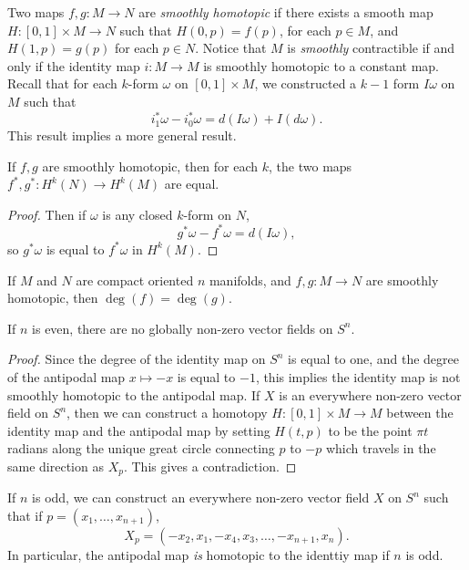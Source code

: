 Two maps $f,g: M \to N$ are \emph{smoothly homotopic} if there exists a smooth map $H: [0,1] \times M \to N$ such that $H(0,p) = f(p)$, for each $p \in M$, and $H(1,p) = g(p)$ for each $p \in N$. Notice that $M$ is \emph{smoothly} contractible if and only if the identity map $i: M \to M$ is smoothly homotopic to a constant map. Recall that for each $k$-form $\omega$ on $[0,1] \times M$, we constructed a $k-1$ form $I\omega$ on $M$ such that
%
\[ i_1^* \omega - i_0^* \omega = d(I\omega) + I(d\omega). \]
%
This result implies a more general result.

\begin{theorem}
    If $f,g$ are smoothly homotopic, then for each $k$, the two maps $f^*, g^*: H^k(N) \to H^k(M)$ are equal.
\end{theorem}
\begin{proof}
    Then if $\omega$ is any closed $k$-form on $N$,
    \[ g^* \omega - f^* \omega = d(I \omega), \]
    so $g^* \omega$ is equal to $f^* \omega$ in $H^k(M)$.
\end{proof}

\begin{corollary}
    If $M$ and $N$ are compact oriented $n$ manifolds, and $f,g: M \to N$ are smoothly homotopic, then $\deg(f) = \deg(g)$.
\end{corollary}

\begin{corollary}
    If $n$ is even, there are no globally non-zero vector fields on $S^n$.
\end{corollary}
\begin{proof}
    Since the degree of the identity map on $S^n$ is equal to one, and the degree of the antipodal map $x \mapsto -x$ is equal to $-1$, this implies the identity map is not smoothly homotopic to the antipodal map. If $X$ is an everywhere non-zero vector field on $S^n$, then we can construct a homotopy $H: [0,1] \times M \to M$ between the identity map and the antipodal map by setting $H(t,p)$ to be the point $\pi t$ radians along the unique great circle connecting $p$ to $-p$ which travels in the same direction as $X_p$. This gives a contradiction.
\end{proof}

\begin{remark}
    If $n$ is odd, we can construct an everywhere non-zero vector field $X$ on $S^n$ such that if $p = (x_1, \dots, x_{n+1})$,
    \[ X_p = (-x_2,x_1,-x_4,x_3, \dots, -x_{n+1},x_n). \]
    In particular, the antipodal map \emph{is} homotopic to the identtiy map if $n$ is odd.
\end{remark}

